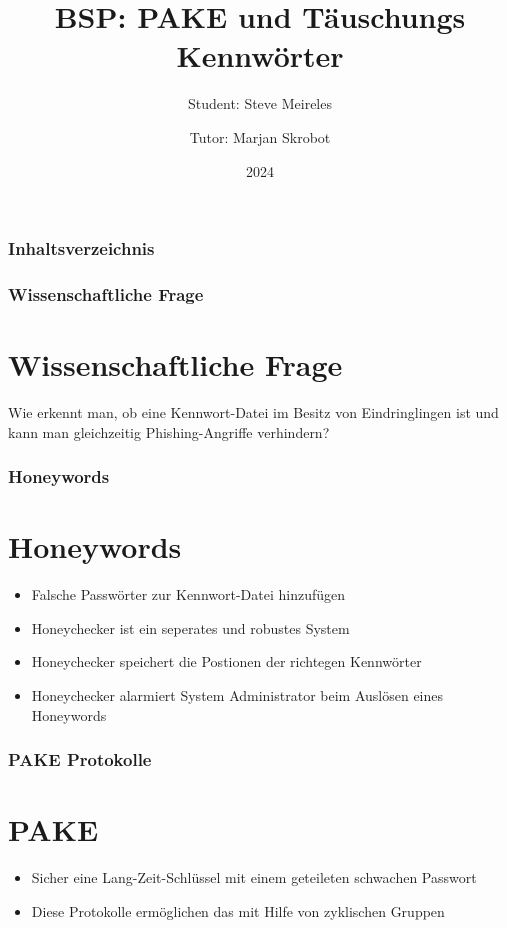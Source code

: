 \documentclass[9pt]{beamer}
\title[PAKE und Honeywords]{BSP: PAKE und Täuschungs Kennwörter}
\author[Steve Meireles]{Student: Steve Meireles \and Tutor: Marjan Skrobot}
\date{2024}
\begin{document}
\frame{\titlepage}

\begin{frame}
\frametitle{Inhaltsverzeichnis}
\tableofcontents
\end{frame}

\begin{frame}
\frametitle{Wissenschaftliche Frage}
\section{Wissenschaftliche Frage}
Wie erkennt
man, ob eine Kennwort-Datei im Besitz von Eindringlingen ist und kann man
	gleichzeitig Phishing-Angriffe verhindern?
\end{frame}

\begin{frame}
\frametitle{Honeywords}
\section{Honeywords}
\begin{itemize}
	\item Falsche Passwörter zur Kennwort-Datei hinzufügen
	\item Honeychecker ist ein seperates und robustes System
	\item Honeychecker speichert die Postionen der richtegen Kennwörter
	\item Honeychecker alarmiert System Administrator beim Auslösen eines Honeywords
\end{itemize}
\end{frame}

\begin{frame}
\frametitle{PAKE Protokolle}
\section{PAKE}
	\begin{itemize}
		\item Sicher eine Lang-Zeit-Schlüssel mit einem geteileten
			schwachen Passwort
		\item Diese Protokolle ermöglichen das mit Hilfe von zyklischen
			Gruppen
	\end{itemize}
\end{frame}
\end{document}
